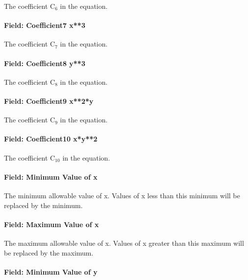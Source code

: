 The coefficient C\(_{6}\) in the equation.

\paragraph{Field: Coefficient7 x**3}\label{field-coefficient7-x3}

The coefficient C\(_{7}\) in the equation.

\paragraph{Field: Coefficient8 y**3}\label{field-coefficient8-y3}

The coefficient C\(_{8}\) in the equation.

\paragraph{Field: Coefficient9 x**2*y}\label{field-coefficient9-x2y}

The coefficient C\(_{9}\) in the equation.

\paragraph{Field: Coefficient10 x*y**2}\label{field-coefficient10-xy2}

The coefficient C\(_{10}\) in the equation.

\paragraph{Field: Minimum Value of x}\label{field-minimum-value-of-x-6}

The minimum allowable value of x. Values of x less than this minimum will be replaced by the minimum.

\paragraph{Field: Maximum Value of x}\label{field-maximum-value-of-x-7}

The maximum allowable value of x. Values of x greater than this maximum will be replaced by the maximum.

\paragraph{Field: Minimum Value of y}\label{field-minimum-value-of-y-1}

